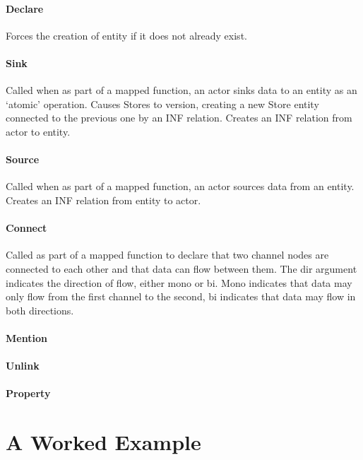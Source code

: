 \documentclass[12pt,twoside,a4paper]{article}
\begin{document}
\paragraph{Declare}
Forces the creation of entity if it does not already exist.

\paragraph{Sink}
Called when as part of a mapped function, an actor sinks data to an entity as an ‘atomic’ operation.
Causes Stores to version, creating a new Store entity connected to the previous one by an INF relation.
Creates an INF relation from actor to entity. 

\paragraph{Source}
Called when as part of a mapped function, an actor sources data from an entity.
Creates an INF relation from entity to actor.

\paragraph{Connect}
Called as part of a mapped function to declare that two channel nodes are connected to each other and that data can flow between them. The dir argument indicates the direction of flow, either mono or bi. Mono indicates that data may only flow from the first channel to the second, bi indicates that data may flow in both directions. 

\paragraph{Mention}

\paragraph{Unlink}

\paragraph{Property}

\section{A Worked Example}
\end{document}
